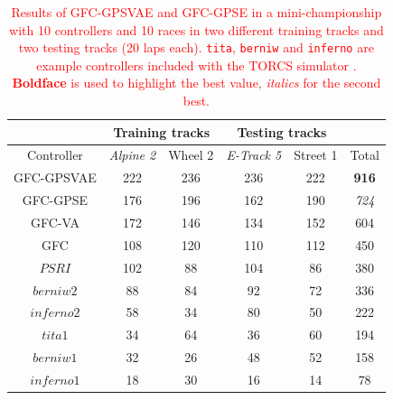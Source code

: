 \documentclass[10pt,journal,compsoc]{IEEEtran}
\begin{document}
\begin{table}[ht]
  \centering
  {\scriptsize
    \caption{ \textcolor{red}{Results of {\sf GFC-GPSVAE} and {\sf GFC-GPSE}
      in a mini-championship with 10 controllers
      and 10 races in two different training tracks and two testing tracks (20 laps each). {\tt tita}, {\tt berniw} and {\tt inferno} are example controllers included with the TORCS
      simulator \cite{torcs4}.  {\bf Boldface} is used to highlight the best value, {\em italics} for the second best.}}
    {
            \begin{tabular}{|c|c|c|c|c||c|}
	\hline
	& \multicolumn{2}{|c|}{Training tracks} &\multicolumn{2}{|c|}{Testing tracks} \\
	\hline
	Controller&\textit{Alpine 2} &Wheel 2&\textit{E-Track 5}  &Street 1&Total\\
        \hline
        \hline



{\sf GFC-GPSVAE}	&\cellcolor{red!25}222&	\cellcolor{red!25}236&\cellcolor{red!25}	236&\cellcolor{red!25}	222&	\cellcolor{red!25} {\bf 916}\\
{\sf GFC-GPSE}	&\cellcolor{red!25}176&	\cellcolor{red!25}196&\cellcolor{red!25}	162&\cellcolor{red!25}	190&\cellcolor{red!25}	{\em 724}\\

{\sf GFC-VA} \cite{DBLP:conf/cig/SalemMG19}&\cellcolor{red!25}172&\cellcolor{red!25}	146&\cellcolor{red!25}	134&\cellcolor{red!25}	152& \cellcolor{red!25}	604\\
{\sf GFC}  \cite{salem_cig2018}	&\cellcolor{red!25}108&\cellcolor{red!25}	120&\cellcolor{red!25}	110&\cellcolor{red!25}	112&\cellcolor{red!25}	450\\
$PSRI$\cite{PerezEvolvingFuzzy09}&\cellcolor{red!25}102&\cellcolor{red!25}	88 &\cellcolor{red!25}	104&\cellcolor{red!25}	86 &  \cellcolor{red!25}  380\\
$berniw2$		&\cellcolor{red!25}88	&\cellcolor{red!25}	84 &\cellcolor{red!25}	92 &\cellcolor{red!25}	72 &\cellcolor{red!25}	336\\
$inferno2$	&\cellcolor{red!25}58	&\cellcolor{red!25}	34 &\cellcolor{red!25}	80 &\cellcolor{red!25}	50 &\cellcolor{red!25}	222\\
$tita1$		&\cellcolor{red!25}34 &	\cellcolor{red!25}64 &\cellcolor{red!25}	36 &\cellcolor{red!25}	60 &\cellcolor{red!25}	194\\
$berniw1$		&\cellcolor{red!25}32	&\cellcolor{red!25}	26 &\cellcolor{red!25}	48 &\cellcolor{red!25}	52 &\cellcolor{red!25}	158\\
$inferno1$	&\cellcolor{red!25}18	&\cellcolor{red!25}	30 &\cellcolor{red!25}	16 &\cellcolor{red!25}	14 &\cellcolor{red!25}	78\\
\hline

\end{tabular}
}\label{tab:allsresults}
}
\end{table}
\end{document}
